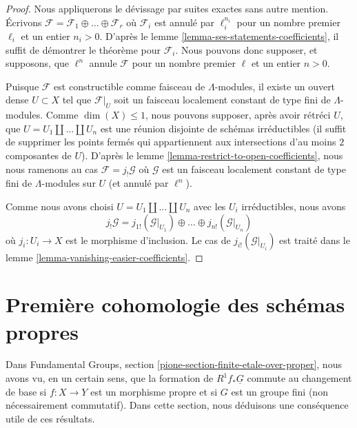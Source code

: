 \begin{proof}
Nous appliquerons le dévissage par suites exactes sans autre mention.
Écrivons $\mathcal{F} = \mathcal{F}_1 \oplus \ldots \oplus \mathcal{F}_r$
où $\mathcal{F}_i$ est annulé par $\ell_i^{n_i}$
pour un nombre premier $\ell_i$ et un entier $n_i > 0$.
D'après le lemme \ref{lemma-ses-statements-coefficients}, il suffit
de démontrer le théorème pour $\mathcal{F}_i$. Nous pouvons donc supposer,
et supposons, que $\ell^n$ annule $\mathcal{F}$ pour un nombre premier $\ell$
et un entier $n > 0$.

\medskip\noindent
Puisque $\mathcal{F}$ est constructible comme faisceau de $\Lambda$-modules,
il existe un ouvert dense $U \subset X$ tel que $\mathcal{F}|_U$ soit un
faisceau localement constant de type fini de $\Lambda$-modules.
Comme $\dim(X) \leq 1$, nous pouvons supposer, après avoir rétréci $U$, que
$U = U_1 \amalg \ldots \amalg U_n$ est une réunion disjointe de schémas
irréductibles (il suffit de supprimer les points fermés qui appartiennent aux
intersections d'au moins $2$ composantes de $U$). D'après le
lemme \ref{lemma-restrict-to-open-coefficients},
nous nous ramenons au cas
$\mathcal{F} = j_!\mathcal{G}$ où $\mathcal{G}$ est un faisceau localement
constant de type fini de $\Lambda$-modules sur $U$ (et annulé
par $\ell^n$).

\medskip\noindent
Comme nous avons choisi $U = U_1 \amalg \ldots \amalg U_n$ avec les $U_i$
irréductibles, nous avons
$$
j_!\mathcal{G} =
j_{1!}(\mathcal{G}|_{U_1}) \oplus \ldots \oplus
j_{n!}(\mathcal{G}|_{U_n})
$$
où $j_i : U_i \to X$ est le morphisme d'inclusion.
Le cas de $j_{i!}(\mathcal{G}|_{U_i})$ est traité dans le
lemme \ref{lemma-vanishing-easier-coefficients}.
\end{proof}








\section{Première cohomologie des schémas propres}
\label{section-finite-etale-over-proper}

\noindent
Dans Fundamental Groups, section \ref{pione-section-finite-etale-over-proper},
nous avons vu, en un certain sens, que la formation de
$R^1f_*\underline{G}$ commute au changement de base si $f : X \to Y$
est un morphisme propre et si $G$ est un groupe fini (non nécessairement
commutatif). Dans cette section,
nous déduisons une conséquence utile de ces résultats.

